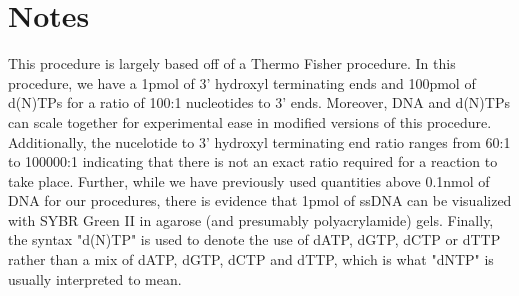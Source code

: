 \documentclass[a4paper]{article}
\begin{document}
\section{Notes}
This procedure is largely based off of a Thermo Fisher procedure\cite{ThermoScientific2016}. In this procedure, we have a 1pmol of 3' hydroxyl terminating ends and 100pmol of d(N)TPs for a ratio of 100:1 nucleotides to 3' ends. Moreover, DNA and d(N)TPs can scale together for experimental ease in modified versions of this procedure. Additionally, the nucelotide to 3' hydroxyl terminating end ratio ranges from 60:1\cite{ThermoScientific2016} to 100000:1\cite{Invitrogen2002} indicating that there is not an exact ratio required for a reaction to take place. Further, while we have previously used quantities above 0.1nmol of DNA for our procedures, there is evidence\cite{Wostemeyer2014} that 1pmol of ssDNA can be visualized with SYBR Green II in agarose (and presumably polyacrylamide) gels. Finally, the syntax "d(N)TP" is used to denote the use of dATP, dGTP, dCTP or dTTP rather than a mix of dATP, dGTP, dCTP and dTTP, which is what "dNTP" is usually interpreted to mean.



\end{document}
